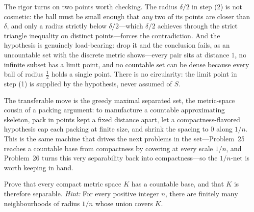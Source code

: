 \documentclass[main.tex]{subfiles}
\begin{document}
\begin{Reflection}
The rigor turns on two points worth checking. The radius $\delta/2$ in step (2) is not cosmetic: the
ball must be small enough that \emph{any} two of its points are closer than $\delta$, and only a radius
strictly below $\delta/2$---which $\delta/2$ achieves through the strict triangle inequality on distinct
points---forces the contradiction. And the hypothesis is genuinely load-bearing: drop it and the
conclusion fails, as an uncountable set with the discrete metric shows---every pair sits at distance
$1$, no infinite subset has a limit point, and no countable set can be dense because every ball of
radius $\tfrac12$ holds a single point. There is no circularity: the limit point in step (1) is supplied
by the hypothesis, never assumed of $S$.

The transferable move is the greedy maximal separated set, the metric-space cousin of a packing
argument: to manufacture a countable approximating skeleton, pack in points kept a fixed distance apart,
let a compactness-flavored hypothesis cap each packing at finite size, and shrink the spacing to $0$
along $1/n$. This is the same machine that drives the next problems in the set---Problem~25 reaches a
countable base from compactness by covering at every scale $1/n$, and Problem~26 turns this very
separability back into compactness---so the $1/n$-net is worth keeping in hand.
\end{Reflection}

Prove that every compact metric space $K$ has a countable base, and that $K$ is therefore separable.
\emph{Hint:} For every positive integer $n$, there are finitely many neighbourhoods of radius $1/n$
whose union covers $K$.
\end{document}
